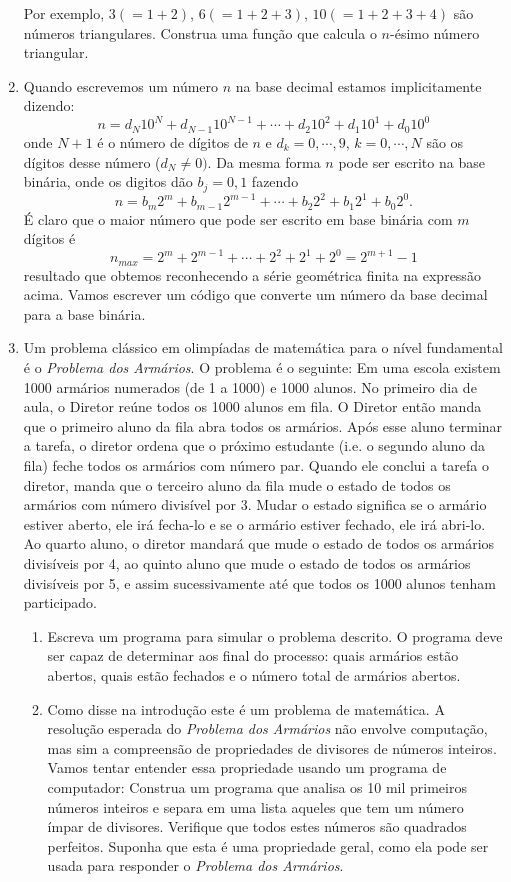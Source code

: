 \begin{enumerate}
    Por exemplo, $3(=1+2)$, $6(=1+2+3)$, $10(=1+2+3+4)$ são números triangulares. Construa uma função que calcula o $n$-ésimo número triangular.
    \item  Quando escrevemos um número $n$ na base decimal estamos implicitamente dizendo:
\[ n = d_N 10^N + d_{N-1} 10^{N-1} + \cdots + d_2 10^2 + d_1 10^1 + d_0 10^0 \]
onde $N+1$ é o número de dígitos de $n$ e $d_k = 0,\cdots,9$, $k=0,\cdots,N$ são os dígitos desse número ($d_N \neq 0)$. Da mesma forma $n$ pode ser escrito na base binária, onde os digitos dão $b_j = 0,1 $ fazendo
\[ n = b_m 2^m + b_{m-1} 2^{m-1}+ \cdots + b_2 2^2 + b_1 2^1 + b_0 2^0. \]
É claro que o maior número que pode ser escrito em base binária com $m$ dígitos é
\[ n_{max} = 2^m + 2^{m-1}+ \cdots + 2^2 + 2^1 +  2^0 = 2^{m+1}-1 \]
resultado que obtemos reconhecendo a série geométrica finita na expressão acima. Vamos escrever um código que converte um número da base decimal para a base binária.
    \item Um problema clássico em olimpíadas de matemática para o nível fundamental é o {\it Problema dos Armários}. O problema é o seguinte: Em uma escola existem 1000 armários numerados (de 1 a 1000) e 1000 alunos. No primeiro dia de aula, o Diretor reúne todos os 1000 alunos em fila. O Diretor então manda que o primeiro aluno da fila abra todos os armários. Após esse aluno terminar a tarefa, o diretor ordena que o próximo estudante (i.e. o segundo aluno da fila) feche todos os armários com número par. Quando ele conclui a tarefa o diretor, manda que o terceiro aluno da fila mude o estado de todos os armários com número divisível por 3. Mudar o estado significa se o armário estiver aberto, ele irá fecha-lo e se o armário estiver fechado, ele irá abri-lo. Ao quarto aluno, o diretor mandará que mude o estado de todos os armários divisíveis por 4, ao quinto aluno que mude o estado de todos os armários divisíveis por 5, e assim sucessivamente até que todos os 1000 alunos tenham participado.
    \begin{enumerate}
        \item Escreva um programa para simular o problema descrito. O programa deve ser capaz de determinar aos final do processo: quais armários estão abertos, quais estão fechados e o número total de armários abertos.
        \item Como disse na introdução este é um problema de matemática. A resolução esperada do {\it Problema dos Armários} não envolve computação, mas sim a compreensão de propriedades de divisores de números inteiros. Vamos tentar entender essa propriedade usando um programa de computador: Construa um programa que analisa os 10 mil primeiros números inteiros e separa em uma lista aqueles que tem um número ímpar de divisores. Verifique que todos estes números são quadrados perfeitos. Suponha que esta é uma propriedade geral, como ela pode ser usada para responder o {\it Problema dos Armários}.

\end{enumerate}
\end{enumerate}
